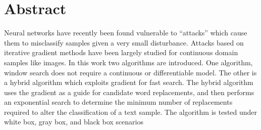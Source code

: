 {
\centering
\section*{Abstract}
}

\noindent
Neural networks have recently been found vulnerable to ``attacks'' which cause them to misclassify samples given a very small disturbance.  Attacks based on iterative gradient methods have been largely studied for continuous domain samples like images.  In this work two algorithms are introduced.  One algorithm, window search does not require a continuous or differentiable model.  The other is a hybrid algorithm which exploits gradient for fast search.  The hybrid algorithm uses the gradient as a guide for candidate word replacements, and then performs an exponential search to determine the minimum number of replacements required to alter the classification of a text sample.  The algorithm is tested under white box, gray box, and black box scenarios
